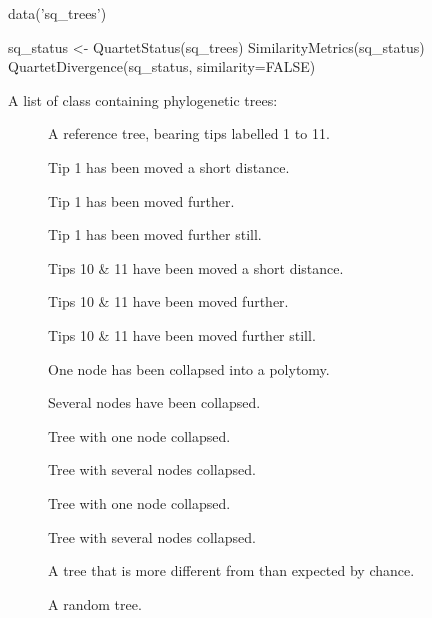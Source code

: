 \documentclass[a4paper]{book}
\begin{document}
%
\begin{Examples}
\begin{ExampleCode}
  data('sq_trees')
  
  sq_status <- QuartetStatus(sq_trees)
  SimilarityMetrics(sq_status)
  QuartetDivergence(sq_status, similarity=FALSE)

\end{ExampleCode}
\end{Examples}
%
\begin{Description}\relax
A list of class  containing phylogenetic trees:
\begin{description}

\item[] A reference tree, bearing tips labelled 1 to 11.
\item[] Tip 1 has been moved a short distance.
\item[] Tip 1 has been moved further.
\item[] Tip 1 has been moved further still.
\item[] Tips 10 \& 11 have been moved a short distance.
\item[] Tips 10 \& 11 have been moved further.
\item[] Tips 10 \& 11 have been moved further still.
\item[] One node has been collapsed into a polytomy.
\item[] Several nodes have been collapsed.
\item[] Tree  with one node collapsed.
\item[] Tree  with several nodes collapsed.
\item[] Tree  with one node collapsed.
\item[] Tree  with several nodes collapsed.
\item[] A tree that is more different from  than expected by chance.
\item[] A random tree.

\end{description}

\end{Description}
\end{document}
